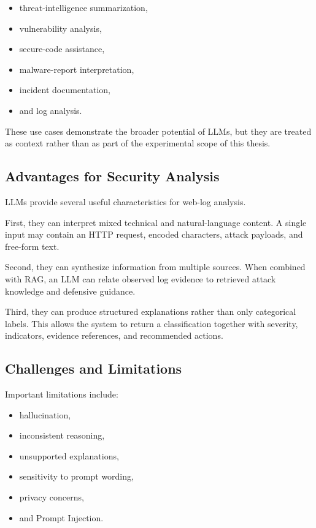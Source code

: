 \begin{itemize}
\tightlist
\item
  threat-intelligence summarization,
\item
  vulnerability analysis,
\item
  secure-code assistance,
\item
  malware-report interpretation,
\item
  incident documentation,
\item
  and log analysis.
\end{itemize}

These use cases demonstrate the broader potential of LLMs, but they are
treated as context rather than as part of the experimental scope of this
thesis.

\subsection{Advantages for Security
Analysis}\label{advantages-for-security-analysis}

LLMs provide several useful characteristics for web-log analysis.

First, they can interpret mixed technical and natural-language content.
A single input may contain an HTTP request, encoded characters, attack
payloads, and free-form text.

Second, they can synthesize information from multiple sources. When
combined with RAG, an LLM can relate observed log evidence to retrieved
attack knowledge and defensive guidance.

Third, they can produce structured explanations rather than only
categorical labels. This allows the system to return a classification
together with severity, indicators, evidence references, and recommended
actions.

\subsection{Challenges and
Limitations}\label{challenges-and-limitations}

Important limitations include:

\begin{itemize}
\tightlist
\item
  hallucination,
\item
  inconsistent reasoning,
\item
  unsupported explanations,
\item
  sensitivity to prompt wording,
\item
  privacy concerns,
\item
  and Prompt Injection.
\end{itemize}

